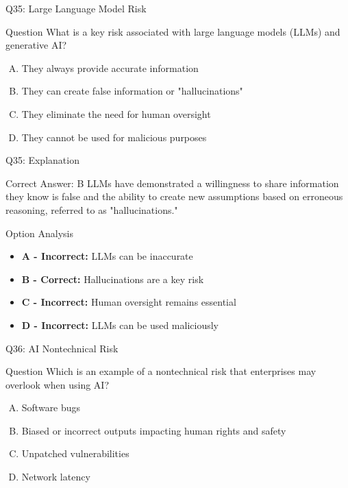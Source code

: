 \documentclass{beamer}
\begin{document}
	\begin{frame}{Q35: Large Language Model Risk}
		\begin{block}{Question}
			What is a key risk associated with large language models (LLMs) and generative AI?
		\end{block}
		\begin{enumerate}[(A)]
			\item They always provide accurate information
			\item They can create false information or "hallucinations"
			\item They eliminate the need for human oversight
			\item They cannot be used for malicious purposes
		\end{enumerate}
	\end{frame}
	
	\begin{frame}{Q35: Explanation}
		\begin{block}{Correct Answer: B}
			LLMs have demonstrated a willingness to share information they know is false and the ability to create new assumptions based on erroneous reasoning, referred to as "hallucinations."
		\end{block}
		\begin{block}{Option Analysis}
			\begin{itemize}
				\item \textbf{A - Incorrect:} LLMs can be inaccurate
				\item \textbf{B - Correct:} Hallucinations are a key risk
				\item \textbf{C - Incorrect:} Human oversight remains essential
				\item \textbf{D - Incorrect:} LLMs can be used maliciously
			\end{itemize}
		\end{block}
	\end{frame}
	
	\begin{frame}{Q36: AI Nontechnical Risk}
		\begin{block}{Question}
			Which is an example of a nontechnical risk that enterprises may overlook when using AI?
		\end{block}
		\begin{enumerate}[(A)]
			\item Software bugs
			\item Biased or incorrect outputs impacting human rights and safety
			\item Unpatched vulnerabilities
			\item Network latency
		\end{enumerate}
	\end{frame}
	
\end{document}
